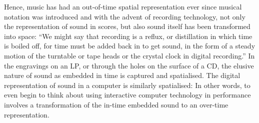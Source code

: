 \documentclass{article}
\begin{document}


Hence, music has had an out-of-time spatial representation ever since musical notation was introduced and %
with the advent of recording technology, not only the representation of sound in scores, but also sound itself has been transformed into space: ``We might say that recording is a reflux, or distillation in which time is boiled off, for time must be added back in to get sound, in the form of a steady motion of the turntable or tape heads or the crystal clock in digital recording.'' \citep[54]{evens05} In the engravings on an LP, or through the holes on the surface of a CD, the elusive nature of sound as embedded in time is captured and spatialised. The digital representation of sound in a computer is similarly spatialised: In other words, to even begin to think about using interactive computer technology in performance involves a transformation of the in-time embedded sound to an over-time representation.
\end{document}

